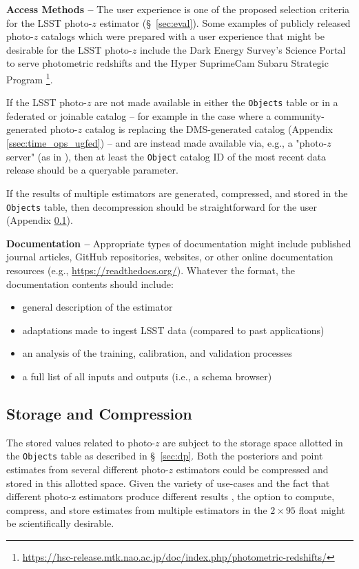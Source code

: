 \documentclass[DM,authoryear,toc]{lsstdoc}
\begin{document}
{\bf Access Methods --} 
The user experience is one of the proposed selection criteria for the LSST photo-$z$ estimator (\S~\ref{sec:eval}). 
Some examples of publicly released photo-$z$ catalogs which were prepared with a user experience that might be desirable for the LSST photo-$z$ include the Dark Energy Survey's Science Portal to serve photometric redshifts \cite{2018A&C....25...58G} and the Hyper SuprimeCam Subaru Strategic Program \cite{2018PASJ...70S...9T}\footnote{\url{https://hsc-release.mtk.nao.ac.jp/doc/index.php/photometric-redshifts/}}.

If the LSST photo-$z$ are not made available in either the {\tt Objects} table or in a federated or joinable catalog -- for example in the case where a community-generated photo-$z$ catalog is replacing the DMS-generated catalog (Appendix \ref{ssec:time_ops_ugfed}) -- and are instead made available via, e.g., a "photo-$z$ server" (as in \cite{2018A&C....25...58G}), then at least the {\tt Object} catalog ID of the most recent data release should be a queryable parameter.

If the results of multiple estimators are generated, compressed, and stored in the {\tt Objects} table, then decompression should be straightforward for the user (Appendix \ref{ssec:dp_store}).

{\bf Documentation --} 
Appropriate types of documentation might include published journal articles, GitHub repositories, websites, or other online documentation resources (e.g., \url{https://readthedocs.org/}). Whatever the format, the documentation contents should include: 
\vspace{-15pt}
\begin{itemize}
\item general description of the estimator
\item adaptations made to ingest LSST data (compared to past applications)
\item an analysis of the training, calibration, and validation processes
\item a full list of all inputs and outputs (i.e., a schema browser)
\end{itemize}

\subsection{Storage and Compression}\label{ssec:dp_store}

The stored values related to photo-$z$ are subject to the storage space allotted in the {\tt Objects} table as described in \S~\ref{sec:dp}.
Both the posteriors and point estimates from several different photo-$z$ estimators could be compressed and stored in this allotted space.
Given the variety of use-cases and the fact that different photo-z estimators produce different results \citep{2020MNRAS.499.1587S}, the option to compute, compress, and store estimates from multiple estimators in the $2\times95$ float might be scientifically desirable.
\end{document}
